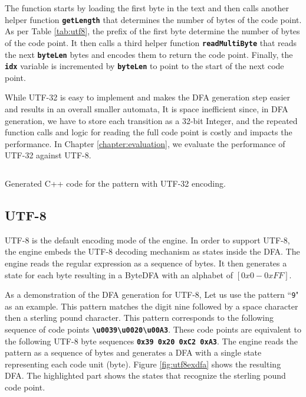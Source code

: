 The function starts by loading the first byte in the text and then calls another helper function \texttt{\textbf{getLength}} that determines the number of bytes of the code point. As per Table \ref{tab:utf8}, the prefix of the first byte determine the number of bytes of the code point. It then calls a third helper function \texttt{\textbf{readMultiByte}} that reads the next \texttt{\textbf{byteLen}} bytes and encodes them to return the code point. Finally, the \texttt{\textbf{idx}} variable is incremented by \texttt{\textbf{byteLen}} to point to the start of the next code point.

While UTF-32 is easy to implement and makes the DFA generation step easier and results in an overall smaller automata, It is space inefficient since, in DFA generation, we have to store each transition as a 32-bit Integer, and the repeated function calls and logic for reading the full code point is costly and impacts the performance. In Chapter \ref{chapter:evaluation}, we evaluate the performance of UTF-32 against UTF-8.

\begin{listing}[H]
\inputminted[breaklines=true,frame=lines,linenos,fontsize=\small]{cpp}{code/utf32.cpp}
\caption{Generated C++ code for the pattern \texttt{\textbf{\textsterling}} with UTF-32 encoding.}\label{lst:utf32nextbyte}
\end{listing}

\subsection{UTF-8}
UTF-8 is the default encoding mode of the engine. In order to support UTF-8, the engine embeds the UTF-8 decoding mechanism as states inside the DFA. The engine reads the regular expression as a sequence of bytes. It then generates a state for each byte resulting in a ByteDFA with an alphabet of $[0x0 - 0xFF]$.

As a demonstration of the DFA generation for UTF-8, Let us use the pattern ``\texttt{9\textvisiblespace \textsterling}" as an example. This pattern matches the digit nine followed by a space character then a sterling pound character. This pattern corresponds to the following sequence of code points \texttt{\textbf{\textbackslash u0039\textbackslash u0020\textbackslash u00A3}}. These code points are equivalent to the following UTF-8 byte sequences \texttt{\textbf{0x39 0x20 0xC2 0xA3}}. The engine reads the pattern as a sequence of bytes and generates a DFA with a single state representing each code unit (byte). Figure \ref{fig:utf8exdfa} shows the resulting DFA. The highlighted part shows the states that recognize the sterling pound code point.

